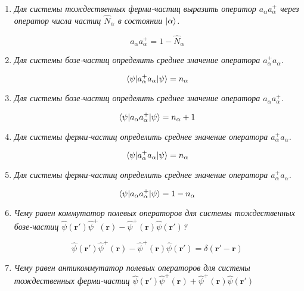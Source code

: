 \documentclass{article}
\begin{document}
\begin{enumerate}
	\item \textit{Для системы тождественных ферми-частиц выразить оператор $a_\alpha a_\alpha^+$ через оператор числа частиц $\hat{N}_\alpha$ в состоянии $\ket{\alpha}$.}
	
	\begin{equation}
		a_\alpha a_\alpha^+  = 1 - \hat{N}_\alpha
	\end{equation}
	
	\item \textit{Для системы бозе-частиц определить среднее значение оператора $a_\alpha^+ a_\alpha$.}
	
	\begin{equation}
		\braket{\psi| a_\alpha^+ a_\alpha|\psi} = n_\alpha
	\end{equation}
	
	\item \textit{Для системы бозе-частиц определить среднее значение оператора $a_\alpha a_\alpha^+$.}
	
	\begin{equation}
		\braket{\psi| a_\alpha a_\alpha^+|\psi} = n_\alpha + 1
	\end{equation}
	
	\item \textit{Для системы ферми-частиц определить среднее значение оператора $a_\alpha^+ a_\alpha$.}
	
	\begin{equation}
		\braket{\psi| a_\alpha^+ a_\alpha|\psi} = n_\alpha
	\end{equation}
	
	\item \textit{Для системы ферми-частиц определить среднее значение оператора $a_\alpha^+ a_\alpha$.}
	
	\begin{equation}
		\braket{\psi| a_\alpha a_\alpha^+|\psi} = 1 - n_\alpha
	\end{equation}	
	
	\item \textit{Чему равен коммутатор полевых операторов для системы тождественных бозе-частиц $\hat{\psi}(\textbf{r}')\hat{\psi}^+(\textbf{r})-\hat{\psi}^+(\textbf{r})\hat{\psi}(\textbf{r}')$?}
	
	\begin{equation}
		\hat{\psi}(\textbf{r}')\hat{\psi}^+(\textbf{r})-\hat{\psi}^+(\textbf{r})\hat{\psi}(\textbf{r}') = \delta(\textbf{r}' - \textbf{r})
	\end{equation}
	
	\item \textit{Чему равен антикоммутатор полевых операторов для системы тождественных ферми-частиц $\hat{\psi}(\textbf{r}')\hat{\psi}^+(\textbf{r}) + \hat{\psi}^+(\textbf{r})\hat{\psi}(\textbf{r}')$}
	

\end{enumerate}
\end{document}
